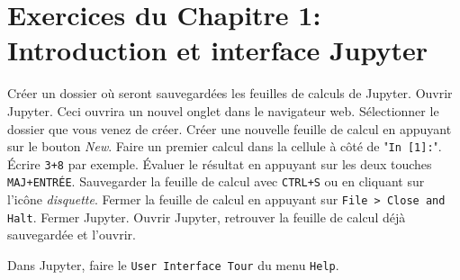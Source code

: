 
\section*{Exercices du Chapitre 1: Introduction et interface Jupyter}

\begin{exercice}
    Créer un dossier où seront sauvegardées les feuilles de calculs de Jupyter.
    Ouvrir Jupyter. Ceci ouvrira un nouvel onglet dans le navigateur web.
    Sélectionner le dossier que vous venez de créer.
    Créer une nouvelle feuille de calcul en appuyant sur le bouton \emph{New}.
    Faire un premier calcul dans la cellule à côté de "\texttt{In [1]:}".
    Écrire \texttt{3+8} par exemple. Évaluer le résultat en appuyant sur les
    deux touches \texttt{MAJ+ENTRÉE}. Sauvegarder la feuille de calcul avec
    \texttt{CTRL+S} ou en cliquant sur l'icône \emph{disquette}. Fermer la
    feuille de calcul en appuyant sur \texttt{File > Close and Halt}. Fermer
    Jupyter. Ouvrir Jupyter, retrouver la feuille de calcul déjà
    sauvegardée et l'ouvrir.
\end{exercice}

\begin{exercice}
    Dans Jupyter, faire le \texttt{User Interface Tour} du menu \texttt{Help}.
\end{exercice}



